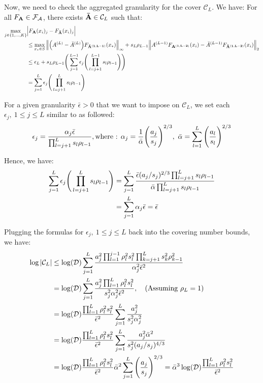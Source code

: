 \noindent Now, we need to check the aggregated granularity for the cover $\mathcal{C}_L$. We have: For all $F_{\bf A}\in\mathcal{F}_\mathcal{A}$, there exists ${\bf \bar A}\in\mathcal{C}_L$ such that:
\begin{align*}
    \max_{j\in\{1, \dots, K\}} &\Big| 
        F_{\bf A}(x_i)_j - F_{\bf \bar A}(x_i)_j
     \Big| \\
    &\le \max_{x_*\in S}\Big\|
        \Big( A^{(L)}-{\bar A}^{(L)} \Big)F_{\bf {\bar A}^{(1, L-1)}}(x_*)
    \Big\|_\infty + s_L\rho_{L-1} \Big\|
        A^{(L-1)}F_{\bf A^{(1, L-2)}}(x_i) - {\bar A}^{(L-1)}F_{\bf {\bar A}^{(1, L-2)}}(x_i) 
    \Big\|_2 \\ 
    &\le \epsilon_L + s_L\rho_{L-1}\Bigg( 
        \sum_{j=1}^{L-1}\epsilon_j\Bigg( 
            \prod_{l=j+1}^{L-1}s_l\rho_{l-1}
         \Bigg)
     \Bigg) \\
    &=\sum_{j=1}^L \epsilon_j\Bigg( \prod_{l=j+1}^L s_l\rho_{l-1} \Bigg)
\end{align*}

\noindent For a given granularity $\bar \epsilon > 0$ that we want to impose on $\mathcal{C}_L$, we set each $\epsilon_j, \ 1 \le j \le L$ similar to \cite{article:bartlett} as followed:
\begin{align*}
    \epsilon_j = \frac{\alpha_j\bar\epsilon}{\prod_{l=j+1}^L s_l\rho_{l-1}}, \text{where : } \alpha_j = \frac{1}{\bar\alpha}\biggRound{\frac{a_j}{s_j}}^{2/3}, \ \bar\alpha=\sum_{l=1}^L \biggRound{\frac{a_l}{s_l}}^{2/3}
\end{align*}

\noindent Hence, we have:
\begin{align*}
    \sum_{j=1}^L \epsilon_j\Bigg( 
        \prod_{l=j+1}^L s_l\rho_{l-1}
     \Bigg) &= \sum_{j=1}^L \frac{\bar\epsilon(a_j/s_j)^{2/3}\prod_{l=j+1}^L s_l\rho_{l-1}}{\bar\alpha\prod_{l=j+1}^Ls_l\rho_{l-1}} \\
    &= \sum_{j=1}^L\alpha_j\bar\epsilon = \bar\epsilon
\end{align*}

\noindent Plugging the formulas for $\epsilon_j, \ 1\le j \le L$ back into the covering number bounds, we have:
\begin{align*}
    \log|\mathcal{C}_L| &\le \log(\mathcal{D})\sum_{j=1}^L \frac{a_j^2\prod_{l=1}^{j-1}\rho_l^2s_l^2\prod_{k=j+1}^L s_k^2\rho_{k-1}^2}{\alpha_j^2\bar\epsilon^2} \\
        &= \log(\mathcal{D})\sum_{j=1}^L \frac{a_j^2\prod_{l=1}^L \rho_l^2s_l^2}{s_j^2\alpha_j^2\bar\epsilon^2}, \ \ \ (\text{Assuming }\rho_L=1) \\
        &= \log(\mathcal{D})\frac{\prod_{l=1}^L \rho_l^2s_l^2}{\bar\epsilon^2}\sum_{j=1}^L \frac{a_j^2}{s_j^2\alpha_j^2} \\
        &= \log(\mathcal{D})\frac{\prod_{l=1}^L \rho_l^2s_l^2}{\bar\epsilon^2}\sum_{j=1}^L \frac{a_j^2\bar\alpha^2}{s_j^2(a_j/s_j)^{4/3}} \\
        &= \log(\mathcal{D})\frac{\prod_{l=1}^L \rho_l^2s_l^2}{\bar\epsilon^2}\bar\alpha^2\sum_{j=1}^L \Bigg( \frac{a_j}{s_j} \Bigg)^{2/3} = \bar\alpha^3\log(\mathcal{D})\frac{\prod_{l=1}^L\rho_l^2s_l^2}{\bar\epsilon^2}
\end{align*}

